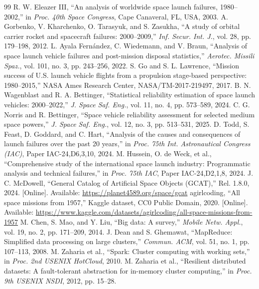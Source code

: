 \documentclass[10pt]{article}
\begin{document}
\begin{thebibliography}{99}
\scriptsize
{} R. W. Eleazer III, ``An analysis of worldwide space launch failures, 1980--2002,'' in \textit{Proc. 40th Space Congress}, Cape Canaveral, FL, USA, 2003.
 A. Gorbenko, V. Kharchenko, O. Tarasyuk, and S. Zasukha, ``A study of orbital carrier rocket and spacecraft failures: 2000--2009,'' \textit{Inf. Secur. Int. J.}, vol. 28, pp. 179--198, 2012.
 L. Ayala Fernández, C. Wiedemann, and V. Braun, ``Analysis of space launch vehicle failures and post-mission disposal statistics,'' \textit{Aerotec. Missili Spaz.}, vol. 101, no. 3, pp. 243--256, 2022.
 S. Go and S. L. Lawrence, ``Mission success of U.S. launch vehicle flights from a propulsion stage-based perspective: 1980--2015,'' NASA Ames Research Center, NASA/TM-2017-219497, 2017.
 B. N. Wagenblast and R. A. Bettinger, ``Statistical reliability estimation of space launch vehicles: 2000--2022,'' \textit{J. Space Saf. Eng.}, vol. 11, no. 4, pp. 573--589, 2024.
 C. G. Norris and R. Bettinger, ``Space vehicle reliability assessment for selected medium space powers,'' \textit{J. Space Saf. Eng.}, vol. 12, no. 3, pp. 513--531, 2025.
 D. Todd, S. Feast, D. Goddard, and C. Hart, ``Analysis of the causes and consequences of launch failures over the past 20 years,'' in \textit{Proc. 75th Int. Astronautical Congress (IAC)}, Paper IAC-24,D6,3,10, 2024.
 M. Hussein, O. de Weck, et al., ``Comprehensive study of the international space launch industry: Programmatic analysis and technical failures,'' in \textit{Proc. 75th IAC}, Paper IAC-24,D2,1,8, 2024.
 J. C. McDowell, ``General Catalog of Artificial Space Objects (GCAT),'' Rel. 1.8.0, 2024. [Online]. Available: \url{https://planet4589.org/space/gcat}
 agirlcoding, ``All space missions from 1957,'' Kaggle dataset, CC0 Public Domain, 2020. [Online]. Available: \url{https://www.kaggle.com/datasets/agirlcoding/all-space-missions-from-1957}
 M. Chen, S. Mao, and Y. Liu, ``Big data: A survey,'' \textit{Mobile Netw. Appl.}, vol. 19, no. 2, pp. 171--209, 2014.
 J. Dean and S. Ghemawat, ``MapReduce: Simplified data processing on large clusters,'' \textit{Commun. ACM}, vol. 51, no. 1, pp. 107--113, 2008.
 M. Zaharia et al., ``Spark: Cluster computing with working sets,'' in \textit{Proc. 2nd USENIX HotCloud}, 2010.
 M. Zaharia et al., ``Resilient distributed datasets: A fault-tolerant abstraction for in-memory cluster computing,'' in \textit{Proc. 9th USENIX NSDI}, 2012, pp. 15--28.

\end{thebibliography}
\end{document}
